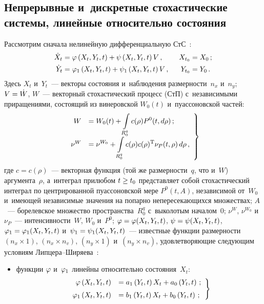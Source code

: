 \begin{multicols}{2}
\section{Непрерывные и~дискретные стохастические системы, линейные относительно состояния}

Рассмотрим сначала нелинейную дифференциальную СтС~\cite{1-s2}:
  \begin{alignat}{2}
  \dot X_t &=\vrp \left(X_t, Y_t, t\right) + \psi \left(X_t, Y_t, t\right) V\,,
  &\enskip 
  X_{t_0} & = X_0\,;\label{e2.1-s2}\\
  \dot Y_t &=\vrp_1 \left(X_t, Y_t, t\right) + \psi_1 \left(X_t, Y_t, t\right) V
  \,,&\enskip 
  Y_{t_0}& = Y_0\,.\label{e2.2-s2}
  \end{alignat}
 Здесь $X_t$ и~$Y_t$~--- векторы состояния и~наблюдения размерности~$n_x$ и~$n_y$; 
 $V\hm= \dot W$, $W$~--- векторный стохастический процесс (СтП) с~независимыми 
 приращениями, состоящий из винеровской $W_0(t)$ и~пуассоновской частей:
\begin{equation}
\left.
\begin{array}{rl}
W&= \displaystyle W_0 (t) +\int\limits_{R_0^q} c(\rho) P^0 (t, d\rho)\,;\\[6pt]
\nu^W &=\displaystyle \nu^{W_0} + \int\limits_{R_0^q} c(\rho) c(\rho)^{\mathrm{T}} 
\nu_P (t, \rho) \,d\rho\,, 
\end{array}
\right\}
\label{e2.3-s2}
\end{equation}
где $c=c(\rho)$~--- векторная функция (той же размерности~$q$, что и~$W$) 
аргумента~$\rho$, а~интеграл при\linebreak любом $t\hm\ge t_0$ представляет собой 
стохастический интеграл по центрированной пуассоновской мере  $P^0 (t, A)$, 
независимой от~$W_0$  и~име\-ющей независимые значения на попарно 
непересе\-ка\-ющих\-ся множествах;  $A$~--- борелевское множество\linebreak
 пространства~$R_0^q$ 
с~выколотым началом~0; $\nu^W$, $\nu^{W_0}$ и~$\nu_P$~--- интенсивности~$W$,
$W_0$ и~$P^0$;
$\vrp\hm=\vrp (X_t, Y_t, t)$, $\psi\hm=\psi (X_t, Y_t, t)$, 
$\vrp_1\hm=\vrp_1 (X_t, Y_t, t)$ и~$\psi_1\hm=\psi_1 (X_t, Y_t, t)$~--- 
известные функции раз\-мер\-ности $(n_x\times 1)$, $(n_x\times n_v)$, $(n_y \times 1)$
и~$(n_y\times n_v)$, удовлетворяющие следующим условиям Лип\-це\-ра--Ши\-ря\-ева~\cite{2-s2}:
\begin{itemize}
\item функции $\varphi$ и~$\varphi_1$ линейны относительно состояния~$X_t$:
        \begin{equation}
        \left.
        \begin{array}{rl}
        \varphi \left(X_t, Y_t, t\right) &= a_1 \left(Y_t, t\right) X_t + a_0 \left(Y_t, t\right) \,;\\[6pt]
        \varphi_1 \left(X_t, Y_t, t\right) &= b_1 \left(Y_t, t\right) X_t +
         b_0 \left(Y_t, t\right) \,;
         \end{array}
         \right\}
         \label{e2.4-s2}
         \end{equation}


\end{itemize}
\end{multicols}

